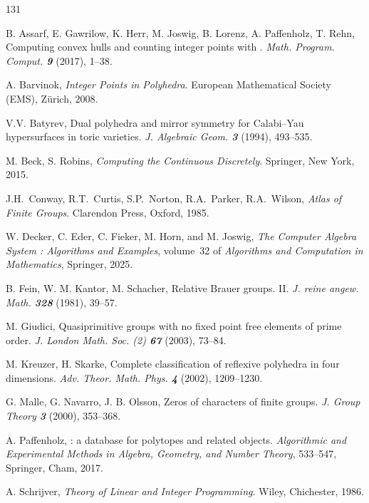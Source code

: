 \documentclass[12pt,leqno,a4paper]{amsart}
\newcommand{\polymake}{{\sf{polymake}}\xspace}
\newcommand{\polyDB}{{\sf{polyDB}}\xspace}
\newcommand{\OSCAR}{{\sf{OSCAR}}\xspace}
\theoremstyle{definition}
\begin{document}
\begin{thebibliography}{131}

{\sc B. Assarf, E. Gawrilow, K. Herr, M. Joswig, B. Lorenz, A. Paffenholz,
  T. Rehn}, Computing convex hulls and counting integer points with \polymake.
  \emph{Math. Program. Comput. \bf 9} (2017), 1--38.

{\sc A. Barvinok}, \emph{Integer Points in Polyhedra}. European Mathematical
  Society (EMS), Z\"urich, 2008.

{\sc V.V. Batyrev}, Dual polyhedra and mirror symmetry for Calabi--Yau
  hypersurfaces in toric varieties. \emph{J. Algebraic Geom. \bf3} (1994),
  493--535.

{\sc M. Beck, S. Robins}, \emph{Computing the Continuous Discretely}. Springer,
  New York, 2015.

{\sc J.H.~Conway, R.T.~Curtis, S.P.~Norton, R.A.~Parker, R.A.~Wilson},
  \emph{Atlas of Finite Groups}. Clarendon Press, Oxford, 1985.

{\sc W. Decker, C. Eder, C. Fieker, M. Horn, and M. Joswig}, \emph{The
  {C}omputer {A}lgebra {S}ystem {\OSCAR}: {A}lgorithms and {E}xamples}, volume~32
  of \emph{Algorithms and {C}omputation in {M}athematics}, Springer, 2025.

{\sc B. Fein, W. M. Kantor, M. Schacher}, Relative Brauer groups. II.
  \emph{J. reine angew. Math. \bf328} (1981), 39--57.

{\sc M. Giudici}, Quasiprimitive groups with no fixed point free elements of
  prime order. \emph{J. London Math. Soc. (2) \bf67} (2003), 73--84. 

{\sc M. Kreuzer, H. Skarke}, Complete classification of reflexive polyhedra in
  four dimensions. \emph{Adv. Theor. Math. Phys. \bf4} (2002), 1209--1230.

{\sc G. Malle, G. Navarro, J. B. Olsson}, Zeros of characters of finite groups.
  \emph{J. Group Theory \bf3} (2000), 353--368.

{\sc A. Paffenholz}, \polyDB: a database for polytopes and related objects.
  \emph{Algorithmic and Experimental Methods in Algebra, Geometry, and Number
  Theory}, 533--547, Springer, Cham, 2017.

{\sc A. Schrijver}, \emph{Theory of Linear and Integer Programming}. Wiley,
  Chichester, 1986.
  

\end{thebibliography}
\end{document}
